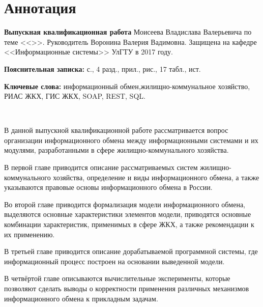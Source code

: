
\section*{Аннотация}

\textbf{Выпускная квалификационная работа} Моисеева Владислава Валерьевича по теме <<\WorkName>>.
Руководитель Воронина Валерия Вадимовна.
Защищена на кафедре <<Информационные системы>> УлГТУ в 2017 году.

\textbf{Пояснительная записка:}  с., 4 разд.,  прил.,  рис., 17 табл.,  ист.

\textbf{Ключевые слова:} информационный обмен,\linebreak жилищно-коммунальное хозяйство, РИАС ЖКХ, ГИС ЖКХ, SOAP, REST, SQL.

~

В данной выпускной квалификационной работе рассматривается вопрос организации информационного обмена между информационными системами и их модулями, разработанными в сфере жилищно-коммунального хозяйства.

В первой главе приводится описание рассматриваемых систем жилищно-коммунального хозяйства, определение и виды информационного обмена, а также указываются правовые основы информационного обмена в России.

Во второй главе приводится формализация модели информационного обмена, выделяются основные характеристики элементов модели, приводятся основные комбинации характеристик, применимых в сфере ЖКХ, а также рекомендации к их применению.

В третьей главе приводится описание дорабатываемой программной системы, где информационный процесс построен на основании выведенной модели.

В четвёртой главе описываются вычислительные эксперименты, которые позволяют сделать выводы о корректности применения различных механизмов информационного обмена к прикладным задачам.

\clearpage
\newpage